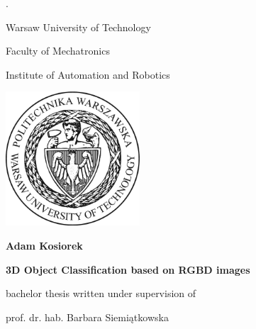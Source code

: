 \documentclass[12pt]{report}
\begin{document}
\pagestyle{empty}
\color{white} . \color{black}
\vspace{0.2cm}

\begin{center}
\begin{Huge}Warsaw University of Technology
\end{Huge}
\end{center}

\begin{center}
\begin{LARGE}Faculty of Mechatronics

\vspace{0.5cm}
Institute of Automation and Robotics
\vspace{0.5cm}
\end{LARGE}
\end{center}
\begin{center}\includegraphics[width=5cm,angle=0]{figs/logopw}\end{center} 

\vspace{1.0cm}

\begin{center}
\begin{LARGE}\textbf{Adam Kosiorek}\end{LARGE}
\end{center}

\vspace{0.5cm}

\begin{center}
\begin{Huge}\textbf{3D Object Classification based on RGBD images}
\vspace{0.5cm}
\end{Huge}
\end{center}

\vspace{0.5cm}

\begin{center}
\begin{Large}bachelor thesis written under supervision of\end{Large}

\vspace{0.2cm}

\begin{LARGE}prof. dr. hab. Barbara Siemiątkowska\end{LARGE}
\end{center}
\end{document}
